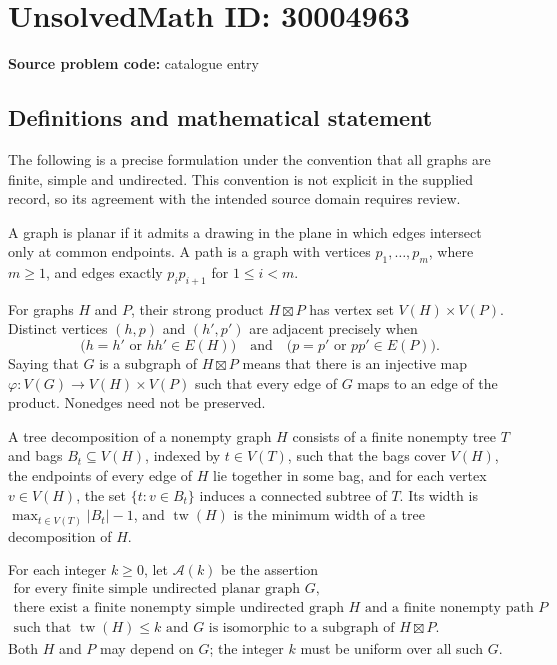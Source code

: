 \documentclass[11pt]{article}
\begin{document}
\section*{UnsolvedMath ID: 30004963}
\textbf{Source problem code:} catalogue entry
\subsection{Definitions and mathematical statement}
The following is a precise formulation under the convention that all graphs are finite, simple and undirected. This convention is not explicit in the supplied record, so its agreement with the intended source domain requires review.

A graph is planar if it admits a drawing in the plane in which edges intersect only at common endpoints. A path is a graph with vertices \(p_1,\ldots,p_m\), where \(m\geq 1\), and edges exactly \(p_ip_{i+1}\) for \(1\leq i<m\).

For graphs \(H\) and \(P\), their strong product \(H\boxtimes P\) has vertex set \(V(H)\times V(P)\). Distinct vertices \((h,p)\) and \((h',p')\) are adjacent precisely when
\[
\bigl(h=h'\text{ or }hh'\in E(H)\bigr)
\quad\text{and}\quad
\bigl(p=p'\text{ or }pp'\in E(P)\bigr).
\]
Saying that \(G\) is a subgraph of \(H\boxtimes P\) means that there is an injective map \(\varphi:V(G)\to V(H)\times V(P)\) such that every edge of \(G\) maps to an edge of the product. Nonedges need not be preserved.

A tree decomposition of a nonempty graph \(H\) consists of a finite nonempty tree \(T\) and bags \(B_t\subseteq V(H)\), indexed by \(t\in V(T)\), such that the bags cover \(V(H)\), the endpoints of every edge of \(H\) lie together in some bag, and for each vertex \(v\in V(H)\), the set \(\{t:v\in B_t\}\) induces a connected subtree of \(T\). Its width is \(\max_{t\in V(T)}|B_t|-1\), and \(\operatorname{tw}(H)\) is the minimum width of a tree decomposition of \(H\).

For each integer \(k\geq 0\), let \(\mathcal A(k)\) be the assertion
\[
\begin{gathered}
\text{for every finite simple undirected planar graph }G,\\
\text{there exist a finite nonempty simple undirected graph }H
\text{ and a finite nonempty path }P\\
\text{such that }\operatorname{tw}(H)\leq k
\text{ and }G\text{ is isomorphic to a subgraph of }H\boxtimes P.
\end{gathered}
\]
Both \(H\) and \(P\) may depend on \(G\); the integer \(k\) must be uniform over all such \(G\).
\end{document}
